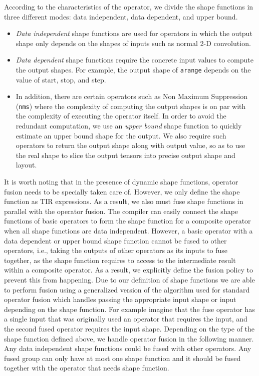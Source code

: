 According to the characteristics of the operator, we divide the shape functions
  in three different modes: data independent, data dependent, and upper bound.
\begin{itemize}
  \item {\em Data independent} shape functions are used for operators in which the output shape
        only depends on the shapes of inputs such as normal 2-D convolution.
  \item {\em Data dependent} shape functions require the concrete input values to compute the output shapes.
        For example, the output shape of \texttt{arange} depends on the value of start, stop, and step.
  \item In addition, there are certain operators such as Non Maximum Suppression (\texttt{nms}) where the
        complexity of computing the output shapes is on par with the complexity of executing the operator itself.
  In order to avoid the redundant computation, we use an {\em upper bound} shape function to quickly estimate an upper bound shape for the output.
  We also require such operators to return the output shape along with output value, so as to use the real shape to slice the output tensors into precise output shape and layout.
\end{itemize}

It is worth noting that in the presence of dynamic shape functions,
  operator fusion needs to be specially taken care of.
However, we only define the shape function as TIR expressions.
As a result, we also must fuse shape functions in
  parallel with the operator fusion.
The compiler can easily connect the shape
  functions of basic operators to form the shape function
  for a composite operator when all shape functions are data independent.
However, a basic operator with a data dependent or upper bound shape
  function cannot be fused to other operators,
  i.e., taking the outputs of other operators as its inputs to fuse together,
  as the shape function requires to access to the intermediate result
  within a composite operator.
As a result, we explicitly define the fusion policy to prevent
  this from happening.
Due to our definition of shape functions we are able to perform fusion
  using a generalized version of the algorithm used for
  standard operator fusion which handles passing the
  appropriate input shape or input depending on the shape function.
For example imagine that the fuse operator has a single input that
  was originally used an operator that requires the input,
  and the second fused operator requires the input shape.
Depending on the type of the shape function defined above,
  we handle operator fusion in the following manner.
Any data independent shape functions could be fused with other operators.
Any fused group can only have at most one shape function and it
  should be fused together with the operator that needs shape function.
